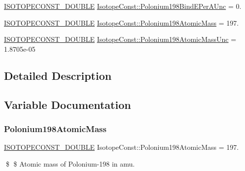 \begin{DoxyCompactItemize}
\mbox{\hyperlink{group___isotope_const-_macros_ga8f45a7272ce02c0b4c65c44636ed719a}{I\+S\+O\+T\+O\+P\+E\+C\+O\+N\+S\+T\+\_\+\+D\+O\+U\+B\+LE}} \mbox{\hyperlink{group___isotope_const-_polonium-_po198_gaa51a7f9de16f070741ee8cac7cf36f4d}{Isotope\+Const\+::\+Polonium198\+Bind\+E\+Per\+A\+Unc}} = 0.
\item 
\mbox{\hyperlink{group___isotope_const-_macros_ga8f45a7272ce02c0b4c65c44636ed719a}{I\+S\+O\+T\+O\+P\+E\+C\+O\+N\+S\+T\+\_\+\+D\+O\+U\+B\+LE}} \mbox{\hyperlink{group___isotope_const-_polonium-_po198_ga0dfeef89a0917f839e64ee68e4737848}{Isotope\+Const\+::\+Polonium198\+Atomic\+Mass}} = 197.
\item 
\mbox{\hyperlink{group___isotope_const-_macros_ga8f45a7272ce02c0b4c65c44636ed719a}{I\+S\+O\+T\+O\+P\+E\+C\+O\+N\+S\+T\+\_\+\+D\+O\+U\+B\+LE}} \mbox{\hyperlink{group___isotope_const-_polonium-_po198_gad7815bd32f1d95dc565ce4c97e93619a}{Isotope\+Const\+::\+Polonium198\+Atomic\+Mass\+Unc}} = 1.\+8705e-\/05
\end{DoxyCompactItemize}


\subsection{Detailed Description}


\subsection{Variable Documentation}
\mbox{\label{group___isotope_const-_polonium-_po198_ga0dfeef89a0917f839e64ee68e4737848}} 
\subsubsection{\texorpdfstring{Polonium198\+Atomic\+Mass}{Polonium198AtomicMass}}
{\footnotesize\ttfamily \mbox{\hyperlink{group___isotope_const-_macros_ga8f45a7272ce02c0b4c65c44636ed719a}{I\+S\+O\+T\+O\+P\+E\+C\+O\+N\+S\+T\+\_\+\+D\+O\+U\+B\+LE}} Isotope\+Const\+::\+Polonium198\+Atomic\+Mass = 197.}

\$ \$ Atomic mass of Polonium-\/198 in amu. \mbox{\label{group___isotope_const-_polonium-_po198_gad7815bd32f1d95dc565ce4c97e93619a}} 
